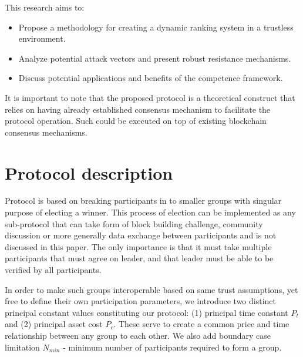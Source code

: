 \documentclass{article}
\begin{document}
\begin{CJK}{UTF8}{gbsn}
    This research aims to:

    \begin{itemize}[nosep]
        \item Propose a methodology for creating a dynamic ranking system in a trustless environment.
        \item Analyze potential attack vectors and present robust resistance mechanisms.
        \item Discuss potential applications and benefits of the competence framework.
    \end{itemize}

    It is important to note that the proposed protocol is a theoretical construct that relies on having already established consensus mechanism to facilitate the protocol operation. Such could be executed on top of existing blockchain consensus mechanisms.

    \section{Protocol description}

    Protocol is based on breaking participants in to smaller groups with singular purpose of electing a winner. This process of election can be implemented as any sub-protocol that can take form of block building challenge, community discussion or more generally data exchange between participants and is not discussed in this paper. The only importance is that it must take multiple participants that must agree on leader, and that leader must be able to be verified by all participants.

    In order to make such groups interoperable based on same trust assumptions, yet free to define their own participation parameters, we introduce two distinct principal constant values constituting our protocol: (1) principal time constant $P_t$ and (2) principal asset cost $P_c$. These serve to create a common price and time relationship between any group to each other. We also add boundary case limitation $N_{min}$ - minimum number of participants required to form a group.


\end{CJK}
\end{document}
